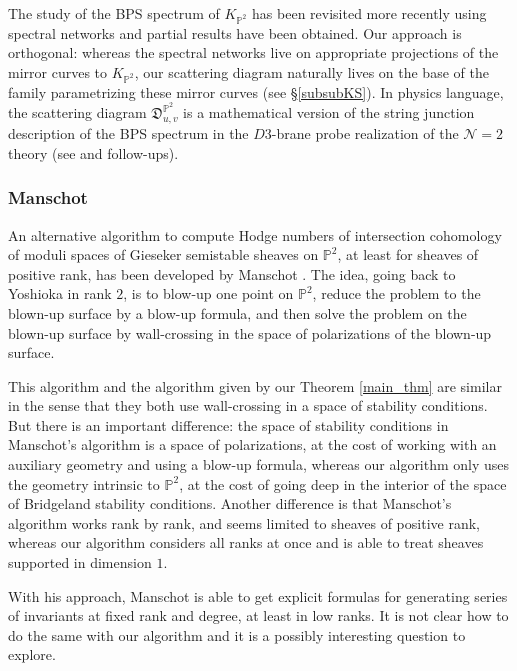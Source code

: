 \documentclass[12pt, a4paper]{amsart}
\newcommand\PP{\mathbb P}
\newcommand\fD{\mathfrak D}
\begin{document}
The study of the BPS spectrum of $K_{\PP^2}$ has been revisited 
more recently using spectral networks
\cite{MR3697419} and partial results have been obtained.
Our approach is orthogonal: whereas the spectral networks live on appropriate projections of the mirror curves to $K_{\PP^2}$, our scattering diagram naturally lives on the base of the family parametrizing these mirror curves (see \S \ref{subsubKS}).
In physics language, the scattering diagram $\fD_{u,v}^{\PP^2}$ is a mathematical version of the string junction description of the BPS spectrum in the $D3$-brane probe realization of the $\mathcal{N}=2$ theory (see \cite{MR1657861} and follow-ups).

 

\subsubsection{Manschot}
An alternative algorithm to compute Hodge numbers of intersection cohomology 
of moduli spaces of Gieseker semistable sheaves
on $\PP^2$, at least for sheaves of positive rank, has been developed by Manschot
\cite{MR2836429, MR3063951, MR3695800, MR3874687}. The idea, going back to Yoshioka 
\cite{MR1285785, MR1339925} in rank $2$, is to blow-up one point on $\PP^2$, reduce the problem to the blown-up 
surface by a blow-up formula, and then solve the problem on the blown-up surface by wall-crossing in the space of polarizations of the blown-up surface.

This algorithm and the algorithm given by  our Theorem 
\ref{main_thm} are similar in the sense that they both use wall-crossing in a space of stability conditions. But there is an important difference: the space of stability conditions in Manschot's algorithm is a space of polarizations, at the cost of working with an auxiliary geometry and using a blow-up formula, whereas our algorithm only uses the geometry intrinsic to $\PP^2$, at the cost of going deep in the interior of the space of Bridgeland stability conditions.
Another difference is that Manschot's algorithm works rank by rank, and seems limited to sheaves of positive rank, whereas our algorithm considers all ranks at once and is able to treat sheaves supported in dimension $1$.
 

With his approach, Manschot is able to get explicit formulas for generating series of invariants at fixed rank and degree, at least
in low ranks. It is not clear how to do the same with our algorithm and it is a possibly interesting question to explore.
\end{document}
